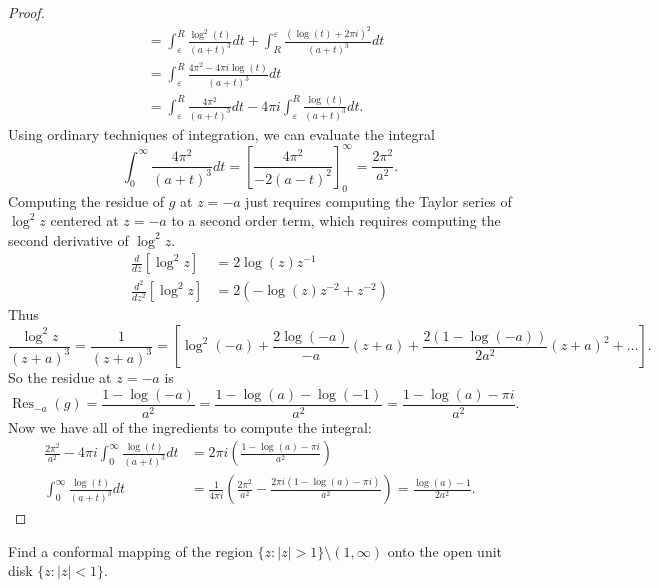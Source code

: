 \documentclass{article}
\newenvironment{problem}[2][Problem]{\begin{trivlist}
\item[\hskip \labelsep {\bfseries #1}\hskip \labelsep {\bfseries #2.}]}{\end{trivlist}}
\begin{document}
\begin{proof}
\begin{align*}
    &=
    \int_\varepsilon^R \frac{\log^2(t)}{(a + t)^3}dt +
    \int_R^\varepsilon \frac{(\log(t) + 2\pi i)^2}{(a + t)^3}dt \\
    &=
    \int_\varepsilon^R \frac{4\pi^2 - 4\pi i\log(t)}{(a + t)^3}dt \\
    &=
    \int_\varepsilon^R \frac{4\pi^2}{(a + t)^3}dt - 4\pi i\int_\varepsilon^R \frac{\log(t)}{(a + t)^3}dt.
  \end{align*}
  Using ordinary techniques of integration, we can evaluate the integral \[
    \int_0^\infty \frac{4\pi^2}{(a + t)^3}dt = \left[\frac{4\pi^2}{-2(a - t)^2}\right]_0^\infty = \frac{2\pi^2}{a^2}.
  \]
  Computing the residue of $g$ at $z = -a$ just requires computing the Taylor
  series of $\log^2z$ centered at $z = -a$ to a second order term, which requires
  computing the second derivative of $\log^2 z$. \begin{align*}
    \frac{d}{dz}[\log^2 z] &= 2\log(z)z^{-1} \\
    \frac{d^2}{dz^2}[\log^2 z] &= 2(-\log(z)z^{-2} + z^{-2})
  \end{align*}
  Thus \[
    \frac{\log^2 z}{(z + a)^3} = \frac{1}{(z + a)^3} = \left[
      \log^2(-a)
      + \frac{2\log(-a)}{-a}(z + a)
      + \frac{2(1 - \log(-a))}{2a^{2}}(z + a)^2
      + \hdots
    \right].
  \]
  So the residue at $z = -a$ is \[
    \operatorname{Res}_{-a}(g)
    = \frac{1 - \log(-a)}{a^{2}}
    = \frac{1 - \log(a) - \log(-1)}{a^{2}}
    = \frac{1 - \log(a) - \pi i}{a^{2}}.
  \]
  Now we have all of the ingredients to compute the integral: \begin{align*}
  \frac{2\pi^2}{a^2} - 4\pi i\int_0^\infty \frac{\log(t)}{(a + t)^3}dt &= 2\pi i \left(\frac{1 - \log(a) - \pi i}{a^{2}}\right) \\
  \int_0^\infty \frac{\log(t)}{(a + t)^3}dt &= \frac{1}{4\pi i}\left(\frac{2\pi^2}{a^2} - \frac{2\pi i(1 - \log(a) - \pi i)}{a^{2}}\right)
  = \frac{\log(a) - 1}{2a^2}.
  \end{align*}
\end{proof}

\pagebreak

\begin{problem}{2}
  Find a conformal mapping of the region
  $\{ z : |z| > 1 \} \setminus (1, \infty)$
  onto the open unit disk $\{ z : |z| < 1\}$.
\end{problem}
\end{document}
